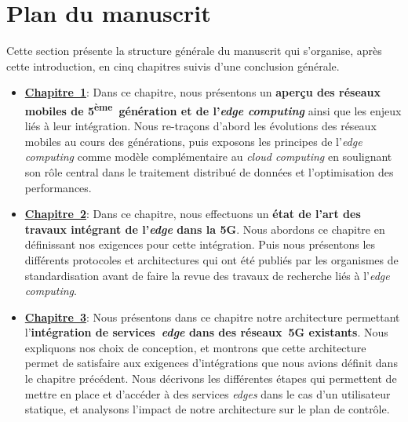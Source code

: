 \documentclass[../main.tex]{subfiles}
\begin{document}
\pagebreak
\section*{Plan du manuscrit}
Cette section présente la structure générale du manuscrit qui s’organise, après cette introduction, en cinq chapitres suivis d’une conclusion générale.

\begin{itemize}
    \item \hyperref[ch:overview-5G-edge]{\textbf{Chapitre~1}}:
    Dans ce chapitre, nous présentons un \textbf{aperçu des réseaux mobiles de 5\textsuperscript{ème}~génération et de l’\textit{edge computing}}
     ainsi que les enjeux liés à leur intégration.
     Nous re-traçons d’abord les évolutions des réseaux mobiles au cours des générations, puis exposons les principes de l’\textit{edge computing} comme modèle complémentaire au \textit{cloud computing} en soulignant son rôle central dans le traitement distribué de données et l’optimisation des performances.

    \item \hyperref[ch:state-of-the-art]{\textbf{Chapitre~2}}:
    Dans ce chapitre, nous effectuons un \textbf{état de l’art des travaux intégrant de l’\textit{edge} dans la 5G}.
    Nous abordons ce chapitre en définissant nos exigences pour cette intégration.
    Puis nous présentons les différents protocoles et architectures qui ont été publiés par les organismes de standardisation avant de faire la revue des travaux de recherche liés à l’\textit{edge computing}.

    \item \hyperref[ch:edge-services-integration]{\textbf{Chapitre~3}}:
    Nous présentons dans ce chapitre notre architecture permettant l’\textbf{intégration de services~\textit{edge} dans des réseaux~5G existants}.
    Nous expliquons nos choix de conception, et montrons que cette architecture permet de satisfaire aux exigences d’intégrations que nous avions définit dans le chapitre précédent.
    Nous décrivons les différentes étapes qui permettent de mettre en place et d’accéder à des services \textit{edges} dans le cas d’un utilisateur statique, et analysons l’impact de notre architecture sur le plan de contrôle.


\end{itemize}
\end{document}
